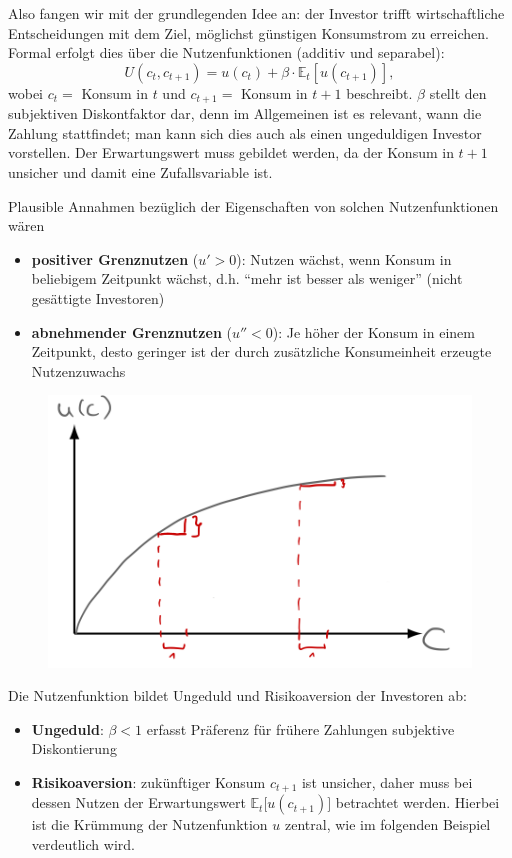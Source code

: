 \documentclass[12pt]{extreport} %
\theoremstyle{named}
\theoremstyle{nnamed}
\theoremstyle{itshape}
\theoremstyle{normal}
\begin{document}
Also fangen wir mit der grundlegenden Idee an: der Investor trifft wirtschaftliche Entscheidungen mit dem Ziel, möglichst günstigen Konsumstrom zu erreichen. Formal erfolgt dies über die Nutzenfunktionen (additiv und separabel):
	$$ U(c_t, c_{t+1}) = u(c_t) + \beta \cdot \mathbb{E}_t\left[ u\left(c_{t+1}\right) \right], $$
wobei $c_t =$ Konsum in $t$ und $c_{t+1} =$ Konsum in $t+1$ beschreibt. $\beta$ stellt den subjektiven Diskontfaktor dar, denn im Allgemeinen ist es relevant, wann die Zahlung stattfindet; man kann sich dies auch als einen ungeduldigen Investor vorstellen. Der Erwartungswert muss gebildet werden, da der Konsum in $t+1$ unsicher und damit eine Zufallsvariable ist. 

\newpage

Plausible Annahmen bezüglich der Eigenschaften von solchen Nutzenfunktionen wären
\begin{itemize}
	\item \textbf{positiver Grenznutzen} ($u' > 0$): Nutzen wächst, wenn Konsum in beliebigem Zeitpunkt wächst, d.h. \enquote{mehr ist besser als weniger} (nicht gesättigte Investoren)
	\item \textbf{abnehmender Grenznutzen} ($u'' < 0$): Je höher der Konsum in einem Zeitpunkt, desto geringer ist der durch zusätzliche Konsumeinheit erzeugte Nutzenzuwachs
\end{itemize} 

\begin{figure}[h!] \centering
	\includegraphics[scale=0.2725]{img/p17}
\end{figure}

Die Nutzenfunktion bildet Ungeduld und Risikoaversion der Investoren ab:

\begin{itemize}
	\item \textbf{Ungeduld}: $\beta < 1$ erfasst Präferenz für frühere Zahlungen subjektive Diskontierung
	\item \textbf{Risikoaversion}: zukünftiger Konsum $c_{t+1}$ ist unsicher, daher muss bei dessen Nutzen der Erwartungswert $\mathbb{E}_t \big[ u(c_{t+1}) \big]$ betrachtet werden. Hierbei ist die Krümmung der Nutzenfunktion $u$ zentral, wie im folgenden Beispiel verdeutlich wird.
\end{itemize} 
\end{document}
